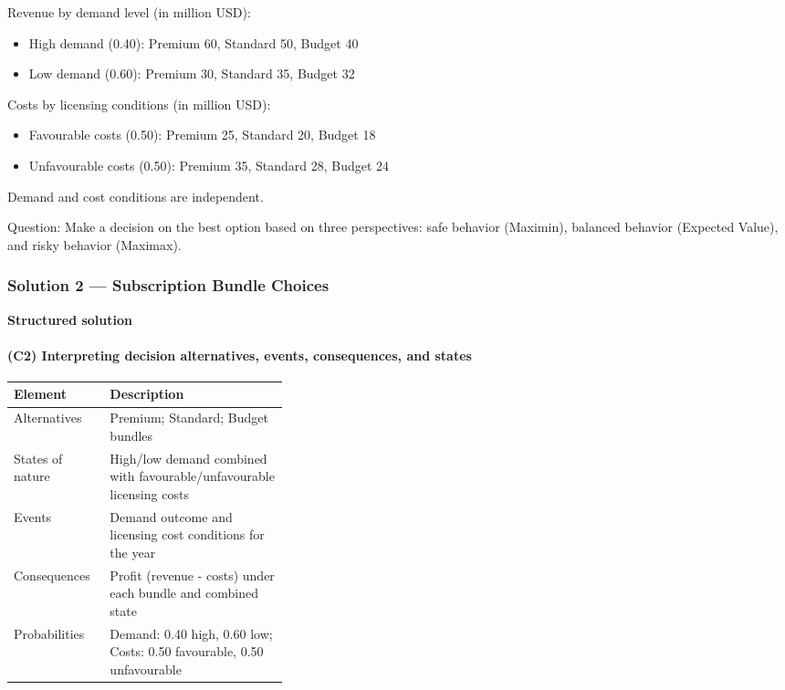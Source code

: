 Revenue by demand level (in million USD):

\begin{itemize}
	\item High demand (0.40): Premium 60, Standard 50, Budget 40
	\item Low demand (0.60): Premium 30, Standard 35, Budget 32
\end{itemize}

Costs by licensing conditions (in million USD):

\begin{itemize}
	\item Favourable costs (0.50): Premium 25, Standard 20, Budget 18
	\item Unfavourable costs (0.50): Premium 35, Standard 28, Budget 24
\end{itemize}

Demand and cost conditions are independent.

Question: Make a decision on the best option based on three perspectives: safe behavior (Maximin), balanced behavior (Expected Value), and risky behavior (Maximax).

\subsubsection{Solution 2 --- Subscription Bundle Choices}\label{subsec:practice-activity-2-solution-2}

\textbf{Structured solution}

\paragraph{(C2) Interpreting decision alternatives, events, consequences, and states}\label{subsubsec:practice-activity-2-solution-2-c2}

\begin{center}
	\begin{tabularx}{\linewidth}{@{}L{0.35\linewidth}Y@{}}
		\toprule
		Element & Description \\
		\midrule
		Alternatives & Premium; Standard; Budget bundles \\
		States of nature & High/low demand combined with favourable/unfavourable licensing costs \\
		Events & Demand outcome and licensing cost conditions for the year \\
		Consequences & Profit (revenue - costs) under each bundle and combined state \\
		Probabilities & Demand: 0.40 high, 0.60 low; Costs: 0.50 favourable, 0.50 unfavourable \\
		\bottomrule
	\end{tabularx}
\end{center}

